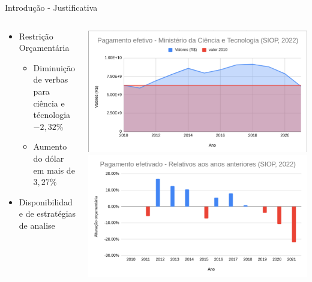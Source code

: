 \documentclass[10pt,brazil]{beamer}
\theoremstyle{definition}
\begin{document}
\begin{frame}{Introdução - Justificativa}
  \begin{columns}
    \begin{column}{0.5\textwidth}
      \begin{itemize}
        \item Restrição Orçamentária
              \begin{itemize}
                \item Diminuição de verbas para ciência e técnologia $-2,32\%$
                \item Aumento do dólar em mais de $3,27\%$
              \end{itemize}
        \item Disponibilidade de estratégias de analise
      \end{itemize}
    \end{column}
    \begin{column}{0.5\textwidth}  %
      \begin{center}
        \includegraphics[width=1\textwidth]{orcamento.png}
        \includegraphics[width=1\textwidth]{variacaoorcamentaria.png}
      \end{center}
    \end{column}
  \end{columns}
\end{frame}
\end{document}

